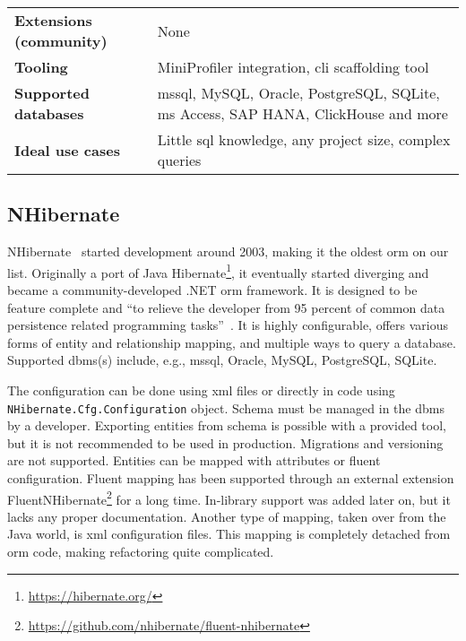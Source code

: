 {\begin{landscape}
\begin{table}[p]
\begin{tabular}{
>{\raggedright\arraybackslash}p{40.00mm}
>{\arraybackslash}p{150.00mm}
}
\textbf{Extensions (community)} & None \\
\textbf{Tooling} & MiniProfiler integration, \acrshort{cli} scaffolding tool \\
\textbf{Supported databases} & \acrshort{mssql}, MySQL, Oracle, PostgreSQL, SQLite, \acrshort{ms} Access, SAP HANA, ClickHouse and more  \\
\textbf{Ideal use cases} & Little \acrshort{sql} knowledge, any project size, complex queries \\
\bottomrule
\end{tabular}
\end{table}
\end{landscape}
}


\subsection{NHibernate}
\label{section:nhibernate}

NHibernate~\cite{nhibernate, nhibernateRepo} started development around 2003, making it the oldest \acrshort{orm} on our list. Originally a port of Java Hibernate\footnote{\url{https://hibernate.org/}}, it eventually started diverging and became a community-developed .NET \acrshort{orm} framework. It is designed to be feature complete and ``to relieve the developer from 95 percent of common data persistence related programming tasks''~\cite{nhibernate}. 
It is highly configurable, offers various forms of entity and relationship mapping, and multiple ways to query a database. Supported \acrshort{dbms}(s) include, e.g.,  \acrshort{mssql}, Oracle, MySQL, PostgreSQL, SQLite.

The configuration can be done using \acrshort{xml} files or directly in code using \texttt{NHibernate.Cfg.Configuration} object. 
Schema must be managed in the \acrshort{dbms} by a developer. Exporting entities from schema is possible with a provided tool, but it is not recommended to be used in production. Migrations and versioning are not supported. Entities can be mapped with attributes or fluent configuration. Fluent mapping has been supported through an external extension FluentNHibernate\footnote{\url{https://github.com/nhibernate/fluent-nhibernate}} for a long time. In-library support was added later on, but it lacks any proper documentation. Another type of mapping, taken over from the Java world, is \acrshort{xml} configuration files. This mapping is completely detached from \acrshort{orm} code, making refactoring quite complicated.

